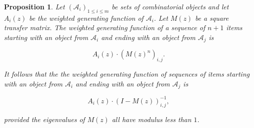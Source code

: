 \documentclass{article}
\newtheorem{proposition}{Proposition}
\begin{document}
\begin{proposition}
\label{th:transfermatrices}
Let $(\mathcal{A}_i)_{1 \leq i \leq m}$ be sets of combinatorial objects
and let $A_i(z)$ be the weighted generating function of $\mathcal{A}_i$.
Let $M(z)$ be a square transfer matrix. The weighted generating function
of a sequence of $n+1$ items starting with an object from $\mathcal{A}_i$
and ending with an object from $\mathcal{A}_j$ is

\begin{equation}
\label{eq:mznij}
A_i(z) \cdot \left( M(z)^n \right)_{i,j}.
\end{equation}

It follows that the the weighted generating function of sequences of items
starting with an object from $\mathcal{A}_i$ and ending with an object
from $\mathcal{A}_j$ is

\begin{equation}
\label{eq:I-Mz}
A_i(z) \cdot \left( I - M(z) \right)^{-1}_{i,j},
\end{equation}

\noindent
provided the eigenvalues of $M(z)$ all have \textit{modulus} less than
$1$.
\end{proposition}
\end{document}
